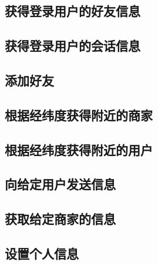 \documentclass[cs4size]{ctexartutf8}
\begin{document}
\subsection{获得登录用户的好友信息}
\subsection{获得登录用户的会话信息}
\subsection{添加好友}
\subsection{根据经纬度获得附近的商家}
\subsection{根据经纬度获得附近的用户}
\subsection{向给定用户发送信息}
\subsection{获取给定商家的信息}
\subsection{设置个人信息}



\newpage
\end{document}
